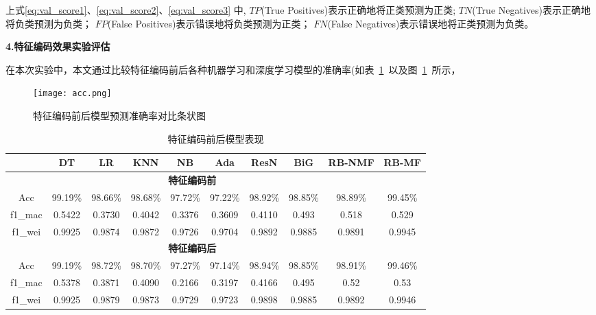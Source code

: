 上式\ref{eq:val_score1}、\ref{eq:val_score2}、\ref{eq:val_score3}%
中,
$TP$(True Positives)表示正确地将正类预测为正类;
$TN$(True Negatives)表示正确地将负类预测为负类；
$FP$(False Positives)表示错误地将负类预测为正类；
$FN$(False Negatives)表示错误地将正类预测为负类。

\textbf{4.特征编码效果实验评估}\par
在本次实验中，本文通过比较特征编码前后各种机器学习和深度学习模型的准确率(如表~\ref{tab:model_performance}~以及图~\ref{fig:comapre_accuracy_encoding}~所示，
\begin{figure}[htbp]
	\centering
	\texttt{[image: acc.png]}
	\caption{特征编码前后模型预测准确率对比条状图}
	\label{fig:comapre_accuracy_encoding}
\end{figure}
\begin{table}[htbp]
	\centering
	\setlength{\tabcolsep}{1pt}
	\caption{特征编码前后模型表现}
	\label{tab:model_performance}
	\begin{tabular}{cccccccccc}
		\toprule
		        & DT               & LR              & KNN             & NB             & Ada               & ResN            & BiG           & RB-NMF          & RB-MF           \\
		\midrule
		\multicolumn{9}{c}{\textbf{特征编码前}}                                                                                                                                   \\
		Acc     & 99.19\%          & 98.66\%         & 98.68\%         & 97.72\%        & 97.22\%           & 98.92\%         & 98.85\%       & 98.89\%         & 99.45\%         \\
		f1\_mac & 0.5422           & 0.3730          & 0.4042          & 0.3376         & 0.3609            & 0.4110          & 0.493         & 0.518           & 0.529           \\
		f1\_wei & 0.9925           & 0.9874          & 0.9872          & 0.9726         & 0.9704            & 0.9892          & 0.9885        & 0.9891          & 0.9945          \\
		\midrule
		\multicolumn{9}{c}{\textbf{特征编码后}}                                                                                                                                   \\
		Acc     & 99.19\%          & 98.72\%\uparrow & 98.70\%\uparrow & 97.27\%        & 97.14\%\downarrow & 98.94\%\uparrow & 98.85\%       & 98.91\%\uparrow & 99.46\%\uparrow \\
		f1\_mac & 0.5378\downarrow & 0.3871\uparrow  & 0.4090\uparrow  & 0.2166         & 0.3197\downarrow  & 0.4166\uparrow  & 0.495\uparrow & 0.52\uparrow    & 0.53\uparrow    \\
		f1\_wei & 0.9925           & 0.9879\uparrow  & 0.9873\uparrow  & 0.9729\uparrow & 0.9723\uparrow    & 0.9898\uparrow  & 0.9885        & 0.9892\uparrow  & 0.9946\uparrow  \\
		\bottomrule
	\end{tabular}
\end{table}
